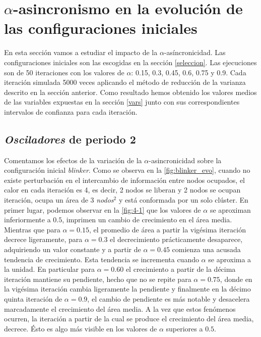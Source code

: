 \documentclass[../proyecto.tex]{memoir}
\begin{document}
\section{$\alpha$-asincronismo en la evolución de las configuraciones iniciales}

En esta sección vamos a estudiar el impacto de la $\alpha$-asíncronicidad. Las configuraciones iniciales son las escogidas en la sección \ref{seleccion}. Las ejecuciones son de 50 iteraciones con los valores de $\alpha$: 0.15, 0.3, 0.45, 0.6, 0.75 y 0.9. Cada iteración simulada 5000 veces aplicando el método de reducción de la varianza descrito en la sección anterior. Como resultado hemos obtenido los valores medios de las variables expuestas en la sección \ref{vars} junto con sus correspondientes intervalos de confianza para cada iteración.

\subsection{\textit{Osciladores} de periodo 2} \label{osci2}

Comentamos los efectos de la variación de la $\alpha$-asincronicidad sobre la configuración inicial \textit{blinker}. Como se observa en la \autoref{fig:blinker_evo}, cuando no existe perturbación en el intercambio de información entre nodos ocupados, el calor en cada iteración es 4, es decir, 2 nodos se liberan y 2 nodos se ocupan iteración, ocupa un área de 3 \textit{nodos}$^2$ y está conformada por un solo clúster. En primer lugar, podemos observar en la \autoref{fig:4-1} que los valores de $\alpha$ se aproximan inferiormente a $0.5$, imprimen un cambio de crecimiento en el área media. Mientras que para $\alpha=0.15$, el promedio de área a partir la vigésima iteración decrece ligeramente, para $\alpha=0.3$ el decrecimiento prácticamente desaparece, adquiriendo un valor constante y a partir de $\alpha=0.45$ comienza una acusada tendencia de crecimiento. Esta tendencia se incrementa cuando $\alpha$ se aproxima a la unidad. En particular para $\alpha=0.60$ el crecimiento a partir de la décima iteración mantiene su pendiente, hecho que no se repite para $\alpha=0.75$, donde en la vigésima iteración cambia ligeramente la pendiente y finalmente en la décimo quinta iteración de $\alpha=0.9$, el cambio de pendiente es más notable y desacelera marcadamente el crecimiento del área media. A la vez que estos fenómenos ocurren, la iteración a partir de la cual se produce el crecimiento del área media, decrece. Ésto es algo más visible en los valores de $\alpha$ superiores a $0.5$.
\end{document}
